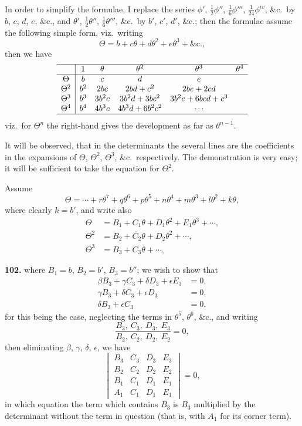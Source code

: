 \documentclass[11pt,a4paper]{article}
\theoremstyle{plain}
\begin{document}
In order to simplify the formulae, I replace the series $\phi'$, $\frac{1}{2}\phi''$, $\frac{1}{6}\phi'''$, $\frac{1}{24}\phi^{iv}$, \&c.\ by $b$, $c$, $d$, $e$, \&c., and $\theta'$, $\frac{1}{2}\theta''$, $\frac{1}{6}\theta'''$, \&c.\ by $b'$, $c'$, $d'$, \&c.; then the formulae assume the following simple form, viz.\ writing
\[
\Theta = b + c\theta + d\theta^2 + e\theta^3 + \&\text{c.},
\]
then we have
\[
\begin{array}{c|ccccc}
\hline
& 1 & \theta & \theta^2 & \theta^3 & \theta^4 \\
\hline
\Theta & b & c & d & e & \\
\Theta^2 & b^2 & 2bc & 2bd + c^2 & 2be + 2cd & \\
\Theta^3 & b^3 & 3b^2c & 3b^2d + 3bc^2 & 3b^2e + 6bcd + c^3 & \\
\Theta^4 & b^4 & 4b^3c & 4b^3d + 6b^2c^2 & \cdots & \\
\hline
\end{array}
\]
viz.\ for $\Theta^n$ the right-hand gives the development as far as $\theta^{n-1}$.

It will be observed, that in the determinants the several lines are the coefficients in the expansions of $\Theta$, $\Theta^2$, $\Theta^3$, \&c.\ respectively. The demonstration is very easy; it will be sufficient to take the equation for $\Theta^2$.

Assume
\[
\Theta = \cdots + r\theta^7 + q\theta^6 + p\theta^5 + n\theta^4 + m\theta^3 + l\theta^2 + k\theta,
\]
where clearly $k = b'$, and write also
\begin{align*}
\Theta &= B_1 + C_1\theta + D_1\theta^2 + E_1\theta^3 + \cdots, \\
\Theta^2 &= B_2 + C_2\theta + D_2\theta^2 + \cdots, \\
\Theta^3 &= B_3 + C_3\theta + \cdots,
\end{align*}

\noindent\textbf{102.} where $B_1 = b$, $B_2 = b'$, $B_3 = b''$; we wish to show that
\begin{align*}
\beta B_3 + \gamma C_3 + \delta D_3 + \epsilon E_3 &= 0, \\
\gamma B_3 + \delta C_3 + \epsilon D_3 &= 0, \\
\delta B_3 + \epsilon C_3 &= 0,
\end{align*}
for this being the case, neglecting the terms in $\theta^5$, $\theta^6$, \&c., and writing
\[
\frac{B_3,\ C_3,\ D_3,\ E_3}{B_2,\ C_2,\ D_2,\ E_2} = 0,
\]
then eliminating $\beta$, $\gamma$, $\delta$, $\epsilon$, we have
\[
\begin{vmatrix}
B_3 & C_3 & D_3 & E_3 \\
B_2 & C_2 & D_2 & E_2 \\
B_1 & C_1 & D_1 & E_1 \\
A_1 & C_1 & D_1 & E_1
\end{vmatrix} = 0,
\]
in which equation the term which contains $B_3$ is $B_3$ multiplied by the determinant without the term in question (that is, with $A_1$ for its corner term).
\end{document}
